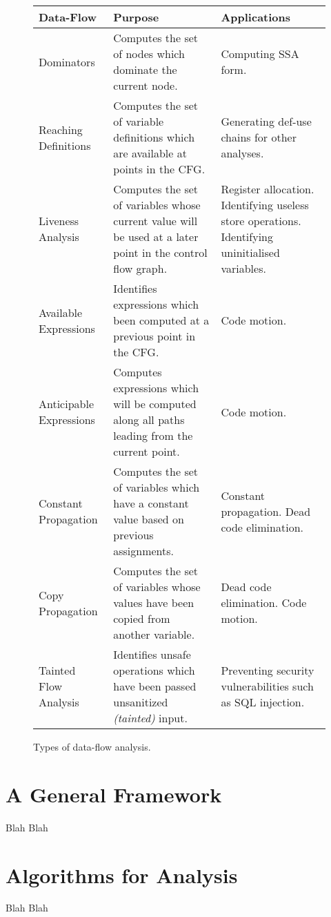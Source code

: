 \documentclass[bsc,twoside,singlespacing,parskip,logo]{infthesis}     %
\begin{document}
        \begin{figure}[!ht]
        \bgroup
        \def\arraystretch{1.5}%
        \begin{tabular}{|l|p{5cm}|p{5cm}|}
        \hline
		{\bf Data-Flow}            & {\bf Purpose}      & {\bf Applications} \\ \hline
        Dominators           & Computes the set of nodes which dominate the current node. & Computing SSA form. \\ \hline
        Reaching Definitions & Computes the set of variable definitions which are available at points in the CFG. & Generating def-use chains for other analyses. \\ \hline
        Liveness Analysis & Computes the set of variables whose current value will be used at a later point in the control flow graph. & Register allocation. Identifying useless store operations. Identifying uninitialised variables. \\ \hline
        Available Expressions & Identifies expressions which been computed at a previous point in the CFG. & Code motion. \\ \hline
        Anticipable Expressions & Computes expressions which will be computed along all paths leading from the current point. & Code motion. \\ \hline
        Constant Propagation & Computes the set of variables which have a constant value based on previous assignments. & Constant propagation. Dead code elimination. \\ \hline
        Copy Propagation & Computes the set of variables whose values have been copied from another variable. & Dead code elimination. Code motion. \\ \hline
        Tainted Flow Analysis\cite{TaintedFlow} & Identifies unsafe operations which have been passed unsanitized {\em (tainted)} input. & Preventing security vulnerabilities such as SQL injection. \\ \hline
		\end{tabular}
        \egroup
        \caption{Types of data-flow analysis.}
        \label{dfatypes}
        \end{figure}

	\section{A General Framework}
	Blah Blah
    
    \section{Algorithms for Analysis}
	Blah Blah
\end{document}
